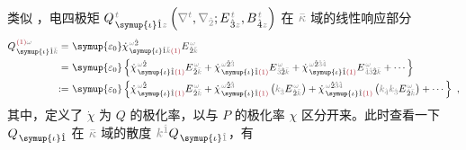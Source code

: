 类似 ，电四极矩 $Q^{\;\!\mathcolor{gray}{t}}_{\;\! \symup{\iota} \hat{1} \mathcolor{gray}{z}} \left( \mathcolor{gray}{\nabla^t}, \mathcolor{gray}{\nabla_{\hat{2}}} ; E^{\;\!\mathcolor{gray}{t}}_{\;\! \hat{3}\mathcolor{gray}{z}}, B^{\;\!\mathcolor{gray}{t}}_{\;\! \hat{4}\mathcolor{gray}{z}} \right)$ 在 $\mathcolor{gray}{\bar{\kappa}}$ 域的线性响应部分
\begin{subequations}
\begin{align}
	Q^{\;\! \textcolor{Maroon}{(1)} \mathcolor{gray}{\omega}}_{\;\! \symup{\iota} \hat{1} \mathcolor{gray}{\bar{k}}} =&~ {\symup{\varepsilon_0}} \dot{\chi}^{\;\! \mathcolor{gray}{\omega} \hat{2}}_{\;\! \symup{\iota} \hat{1} \mathcolor{gray}{\bar{k}} \textcolor{Maroon}{(1)}} E^{\;\!\mathcolor{gray}{\omega}}_{\;\! \hat{2} \mathcolor{gray}{\bar{k}}} \\ =&~ {\symup{\varepsilon_0}} \left\{ \dot{\chi}^{\;\! \mathcolor{gray}{\omega} \hat{2}}_{\;\! \symup{\iota} \hat{1} \textcolor{Maroon}{(1)}} E^{\;\!\mathcolor{gray}{\omega}}_{\;\! \hat{2} \mathcolor{gray}{\bar{k}}} + \dot{\chi}^{\;\! \mathcolor{gray}{\omega} \hat{2} \mathcolor{gray}{\hat{3}}}_{\;\! \symup{\iota} \hat{1} \textcolor{Maroon}{(1)}} E^{\;\!\mathcolor{gray}{\omega}}_{\;\! \mathcolor{gray}{\hat{3}} \hat{2} \mathcolor{gray}{\bar{k}}} + \dot{\chi}^{\;\! \mathcolor{gray}{\omega} \hat{2} \mathcolor{gray}{\hat{3} \hat{4}}}_{\;\! \symup{\iota} \hat{1} \textcolor{Maroon}{(1)}} E^{\;\!\mathcolor{gray}{\omega}}_{\;\! \mathcolor{gray}{\hat{4} \hat{3}} \hat{2} \mathcolor{gray}{\bar{k}}} + \cdots \right\}  \label{Q(1)_wk} \\ :=&~ {\symup{\varepsilon_0}} \left\{ \dot{\chi}^{\;\! \mathcolor{gray}{\omega} \hat{2}}_{\;\! \symup{\iota} \hat{1} \textcolor{Maroon}{(1)}} E^{\;\!\mathcolor{gray}{\omega}}_{\;\! \hat{2} \mathcolor{gray}{\bar{k}}} + \dot{\chi}^{\;\! \mathcolor{gray}{\omega} \hat{2} \mathcolor{gray}{\hat{3}}}_{\;\! \symup{\iota} \hat{1} \textcolor{Maroon}{(1)}} \left( \mathcolor{gray}{k_{\hat{3}}} E^{\;\!\mathcolor{gray}{\omega}}_{\;\! \hat{2} \mathcolor{gray}{\bar{k}}} \right) + \dot{\chi}^{\;\! \mathcolor{gray}{\omega} \hat{2} \mathcolor{gray}{\hat{3} \hat{4}}}_{\;\! \symup{\iota} \hat{1} \textcolor{Maroon}{(1)}} \left( \mathcolor{gray}{k_{\hat{4}} k_{\hat{3}}} E^{\;\!\mathcolor{gray}{\omega}}_{\;\! \hat{2} \mathcolor{gray}{\bar{k}}} \right) + \cdots \right\}~,
\end{align}
\end{subequations}
其中，定义了 $\dot{\chi}$ 为 $Q$ 的极化率，以与 $P$ 的极化率 $\chi$ 区分开来。此时查看一下 $Q_{\;\! \symup{\iota} \hat{1}}$ 在 $\mathcolor{gray}{\bar{\kappa}}$ 域的散度 $\mathcolor{gray}{k^{\hat{1}}} Q_{\;\! \symup{\iota} \mathcolor{gray}{\hat{1}}}$，有
